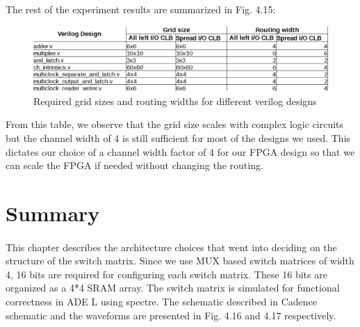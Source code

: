 The rest of the experiment results are summarized in Fig. 4.15:
\begin{figure}[H]
\centering
\includegraphics[scale=0.42]{analysis_table.png}
\caption{Required grid sizes and routing widths for different verilog designs}
\label{fig:Figure}
\end{figure}
From this table, we observe that the grid size scales with complex logic circuits but the channel width of 4 is still sufficient for most of the designs we used. This dictates our choice of a channel width factor of 4 for our FPGA design so that we can scale the FPGA if needed without changing the routing.

\section{Summary}
\paragraph{}
This chapter describes the architecture choices that went into deciding on the structure of the switch matrix. Since we use MUX based switch matrices of width 4, 16 bits are required for configuring each switch matrix. These 16 bits are organized as a 4*4 SRAM array. The switch matrix is simulated for functional correctness in ADE L using spectre. The schematic described in Cadence schematic and the waveforms are presented in Fig. 4.16 and 4.17 respectively.

